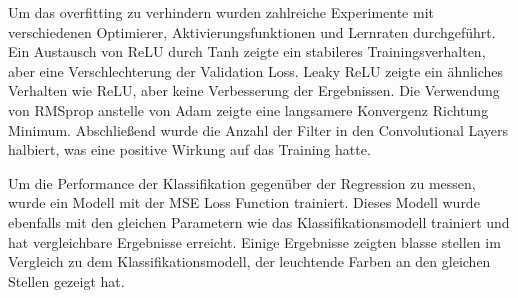 Um das \gls{overfitting} zu verhindern wurden zahlreiche Experimente mit verschiedenen Optimierer, Aktivierungsfunktionen und Lernraten durchgeführt.
Ein Austausch von ReLU durch Tanh zeigte ein stabileres Trainingsverhalten, aber eine Verschlechterung der Validation Loss. Leaky ReLU zeigte 
ein ähnliches Verhalten wie ReLU, aber keine Verbesserung der Ergebnissen. Die Verwendung von RMSprop anstelle von Adam zeigte eine langsamere Konvergenz Richtung Minimum.
Abschließend wurde die Anzahl der Filter in den Convolutional Layers halbiert, was eine positive Wirkung auf das Training hatte.   

Um die Performance der Klassifikation gegenüber der Regression zu messen, wurde ein Modell mit der MSE Loss Function trainiert. Dieses Modell
wurde ebenfalls mit den gleichen Parametern wie das Klassifikationsmodell trainiert und hat vergleichbare Ergebnisse erreicht. Einige Ergebnisse
zeigten blasse stellen im Vergleich zu dem Klassifikationsmodell, der leuchtende Farben an den gleichen Stellen gezeigt hat.

